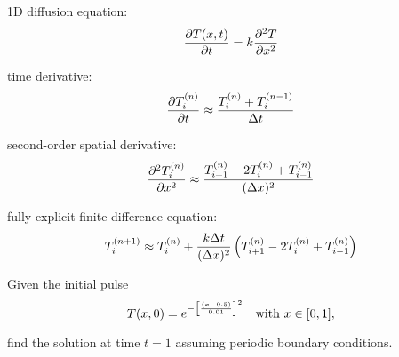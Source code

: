 \newcommand{\tni}{\ensuremath{T^{(n)}_i}}
\begin{frame}{}
  1D diffusion equation:
  \[
    {\partial T(x,t)\over\partial t}=k{\partial^2 T\over\partial x^2}
  \]

  time derivative:
  \[
    {\partial\tni\over\partial t}\approx{\tni+T^{(n-1)}_i\over\Delta t}
  \]

  second-order spatial derivative:
  \[
    {\partial^2\tni\over\partial x^2}\approx{T^{(n)}_{i+1}-2T^{(n)}_i+T^{(n)}_{i-1}\over(\Delta x)^2}
  \]

  fully explicit finite-difference equation:
  \[
    T^{(n+1)}_i\approx T^{(n)}_i+{k\Delta t\over(\Delta x)^2}\left(T^{(n)}_{i+1}-2T^{(n)}_i+T^{(n)}_{i-1}\right)
  \]

  Given the initial pulse
  \[
    T(x,0)=e^{-{\left[(x-0.5)\over 0.01\right]}^2}\quad\text{with }x\in[0,1],
  \]

  find the solution at time $t=1$ assuming periodic boundary conditions.

\end{frame}
